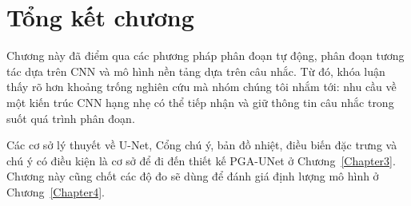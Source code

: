 \section{Tổng kết chương}
\label{sec:summary_ch2}

Chương này đã điểm qua các phương pháp phân đoạn tự động, phân đoạn tương tác dựa trên CNN và mô hình nền tảng dựa trên câu nhắc. Từ đó, khóa luận thấy rõ hơn khoảng trống nghiên cứu mà nhóm chúng tôi nhắm tới: nhu cầu về một kiến trúc CNN hạng nhẹ có thể tiếp nhận và giữ thông tin câu nhắc trong suốt quá trình phân đoạn.

Các cơ sở lý thuyết về U-Net, Cổng chú ý, bản đồ nhiệt, điều biến đặc trưng và chú ý có điều kiện là cơ sở để đi đến thiết kế PGA-UNet ở Chương~\ref{Chapter3}. Chương này cũng chốt các độ đo sẽ dùng để đánh giá định lượng mô hình ở Chương~\ref{Chapter4}.
